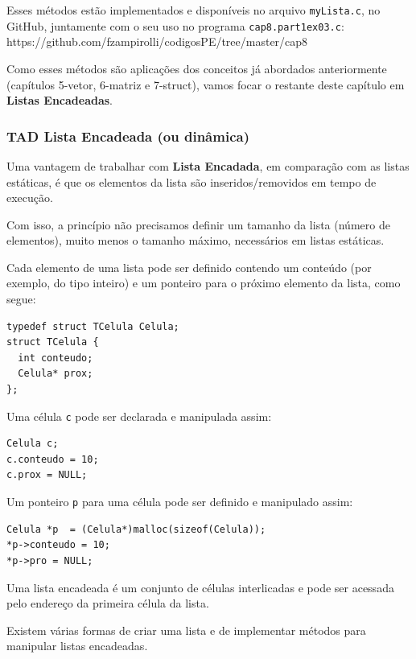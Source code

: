 \documentclass[12pt,a4paper]{article}
\begin{document}
Esses métodos estão implementados e disponíveis no arquivo
\texttt{myLista.c}, no GitHub, juntamente com o seu uso no programa
\texttt{cap8.part1ex03.c}:
https://github.com/fzampirolli/codigosPE/tree/master/cap8

Como esses métodos são aplicações dos conceitos já abordados
anteriormente (capítulos 5-vetor, 6-matriz e 7-struct), vamos focar o
restante deste capítulo em \textbf{Listas Encadeadas}.

    \hypertarget{tad-lista-encadeada-ou-dinuxe2mica}{%
\subsubsection{TAD Lista Encadeada (ou
dinâmica)}\label{tad-lista-encadeada-ou-dinuxe2mica}}

    Uma vantagem de trabalhar com \textbf{Lista Encadada}, em comparação com
as listas estáticas, é que os elementos da lista são inseridos/removidos
em tempo de execução.

Com isso, a princípio não precisamos definir um tamanho da lista (número
de elementos), muito menos o tamanho máximo, necessários em listas
estáticas.

Cada elemento de uma lista pode ser definido contendo um conteúdo (por
exemplo, do tipo inteiro) e um ponteiro para o próximo elemento da
lista, como segue:

\begin{verbatim}
typedef struct TCelula Celula;
struct TCelula {
  int conteudo;
  Celula* prox;
};
\end{verbatim}

Uma célula \texttt{c} pode ser declarada e manipulada assim:

\begin{verbatim}
Celula c;
c.conteudo = 10;
c.prox = NULL;
\end{verbatim}

Um ponteiro \texttt{p} para uma célula pode ser definido e manipulado
assim:

\begin{verbatim}
Celula *p  = (Celula*)malloc(sizeof(Celula));
*p->conteudo = 10;
*p->pro = NULL;
\end{verbatim}

Uma lista encadeada é um conjunto de células interlicadas e pode ser
acessada pelo endereço da primeira célula da lista.

Existem várias formas de criar uma lista e de implementar métodos para
manipular listas encadeadas.
\end{document}
